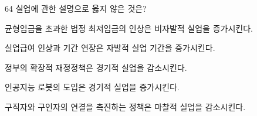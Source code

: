 \begin{question}{64}
실업에 관한 설명으로 옳지 않은 것은?
\begin{choices}
  \item 균형임금을 초과한 법정 최저임금의 인상은 비자발적 실업을 증가시킨다.
  \item 실업급여 인상과 기간 연장은 자발적 실업 기간을 증가시킨다.
  \item 정부의 확장적 재정정책은 경기적 실업을 감소시킨다.
  \item 인공지능 로봇의 도입은 경기적 실업을 증가시킨다.
  \item 구직자와 구인자의 연결을 촉진하는 정책은 마찰적 실업을 감소시킨다.
\end{choices}
\end{question}
